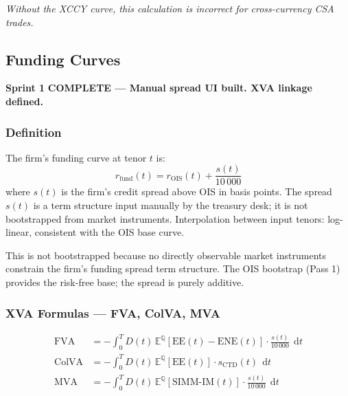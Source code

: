 \documentclass[11pt, a4paper]{article}
\newcommand{\sprintstatus}[3]{%
  \begin{tcolorbox}[sprintbox]
  \small
  \textbf{\color{navy}Sprint #1} \quad
  \textbf{\color{#2}#3}
  \end{tcolorbox}\vspace{4pt}
}
\begin{document}
\emph{Without the XCCY curve, this calculation is incorrect for cross-currency CSA trades.}

\subsection{Funding Curves}

\sprintstatus{1}{teal!70!black}{COMPLETE — Manual spread UI built. XVA linkage defined.}

\subsubsection{Definition}

\begin{tcolorbox}[definition, title={Funding Curve}]
The firm's funding curve at tenor $t$ is:
\begin{equation}
  r_{\mathrm{fund}}(t) = r_{\mathrm{OIS}}(t) + \frac{s(t)}{10\,000}
\end{equation}
where $s(t)$ is the firm's credit spread above OIS in basis points.
The spread $s(t)$ is a term structure input manually by the treasury desk;
it is not bootstrapped from market instruments.
Interpolation between input tenors: log-linear, consistent with the OIS base curve.
\end{tcolorbox}

This is not bootstrapped because no directly observable market instruments
constrain the firm's funding spread term structure. The OIS bootstrap (Pass 1)
provides the risk-free base; the spread is purely additive.

\subsubsection{XVA Formulas — FVA, ColVA, MVA}

\begin{tcolorbox}[formula]
\begin{align}
  \mathrm{FVA}
  &= -\int_0^T D(t)\,\mathbb{E}^{\mathbb{Q}}\!\left[\mathrm{EE}(t) - \mathrm{ENE}(t)\right]
     \cdot \frac{s(t)}{10\,000}\;\,\mathrm{d}t
  \label{eq:fva}\\[6pt]
  \mathrm{ColVA}
  &= -\int_0^T D(t)\,\mathbb{E}^{\mathbb{Q}}\!\left[\mathrm{EE}(t)\right]
     \cdot s_{\mathrm{CTD}}(t)\;\,\mathrm{d}t
  \label{eq:colva}\\[6pt]
  \mathrm{MVA}
  &= -\int_0^T D(t)\,\mathbb{E}^{\mathbb{Q}}\!\left[\mathrm{SIMM\text{-}IM}(t)\right]
     \cdot \frac{s(t)}{10\,000}\;\,\mathrm{d}t
  \label{eq:mva}
\end{align}
\end{tcolorbox}
\end{document}
